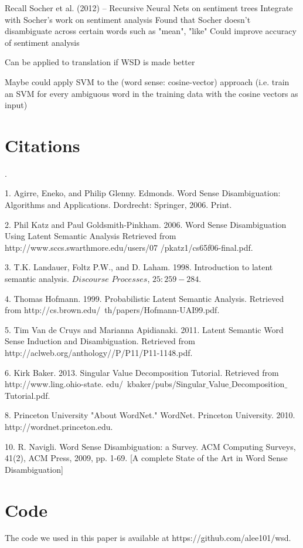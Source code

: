 \documentclass[10pt, letterpaper]{article}
\begin{document}
	Recall Socher et al. (2012) -- Recursive Neural Nets on sentiment trees
	Integrate with Socher's work on sentiment analysis
	Found that Socher doesn't disambiguate across certain words such as "mean", "like"
	Could improve accuracy of sentiment analysis	

	Can be applied to translation if WSD is made better

	Maybe could apply SVM to the (word sense: cosine-vector) approach (i.e. train an SVM 
	for every ambiguous word in the training data with the cosine vectors as input)

	\section{Citations} 
	.

	1. Agirre, Eneko, and Philip Glenny. Edmonds. Word Sense Disambiguation: Algorithms and Applications. Dordrecht: Springer, 2006. Print.

	2. Phil Katz and Paul Goldsmith-Pinkham. 2006. Word Sense Disambiguation Using Latent Semantic Analysis Retrieved from http://www.sccs.swarthmore.edu/users/07 /pkatz1/cs65f06-final.pdf.

	3. T.K. Landauer, Foltz P.W., and D. Laham. 1998. Introduction to latent semantic analysis. $\textit{Discourse Processes}$, $25:259-284$. 

	4. Thomas Hofmann. 1999. Probabilistic Latent Semantic Analysis. Retrieved from http://cs.brown.edu/~th/papers/Hofmann-UAI99.pdf. 

	5. Tim Van de Cruys and Marianna Apidianaki. 2011. Latent Semantic Word Sense Induction and Disambiguation. Retrieved from http://aclweb.org/anthology//P/P11/P11-1148.pdf. 

	6. Kirk Baker. 2013. Singular Value Decomposition Tutorial. Retrieved from http://www.ling.ohio-state. edu/~kbaker/pubs/Singular$\_$Value$\_$Decomposition$\_$Tutorial.pdf. 

	8. Princeton University "About WordNet." WordNet. Princeton University. 2010. http://wordnet.princeton.edu. 

	10. R. Navigli. Word Sense Disambiguation: a Survey. ACM Computing Surveys, 41(2), ACM Press, 2009, pp. 1-69. [A complete State of the Art in Word Sense Disambiguation]

	\section{Code}

	The code we used in this paper is available at https://github.com/alee101/wsd. 


 
\end{document}

